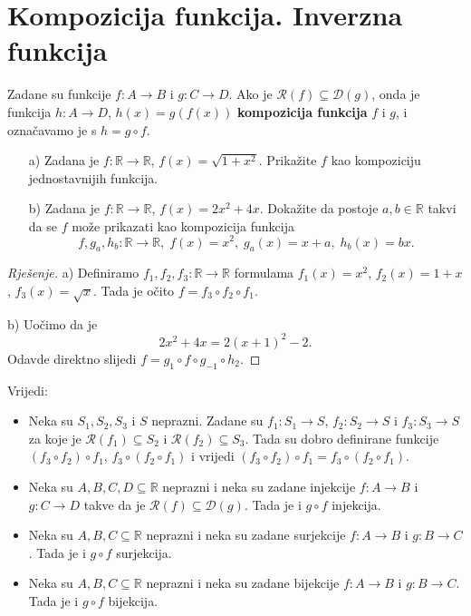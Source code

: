 \section{Kompozicija funkcija. Inverzna funkcija}
\begin{definition}
Zadane su funkcije $f : A\to B$ i $g : C\to D$. Ako je $\mathcal{R}(f)\subseteq \mathcal{D}(g)$, onda je funkcija $h : A\to D$, $h(x)=g(f(x))$ \textbf{kompozicija funkcija} $f$ i $g$, i označavamo je s $h=g\circ f$.
\end{definition}
\begin{exercise} \textbf{}
\begin{itemize}
\item[a)] Zadana je $f : \mathbb{R}\to \mathbb{R}$, $f(x)=\sqrt{1+x^2}$. Prikažite $f$ kao kompoziciju jednostavnijih funkcija.
\item[b)] Zadana je $f : \mathbb{R}\to \mathbb{R}$, $f(x)=2x^2+4x$. Dokažite da postoje $a, b\in \mathbb{R}$ takvi da se $f$ može prikazati kao kompozicija funkcija $$f,g_a,h_b : \mathbb{R}\to \mathbb{R},\;f(x)=x^2,\; g_a(x)=x+a,\; h_b(x)=bx.$$
\end{itemize}
\end{exercise}
\begin{proof}[Rješenje]
a) Definiramo $f_1, f_2, f_3 : \mathbb{R}\to \mathbb{R}$ formulama $f_1(x)=x^2$, $f_2(x)=1+x$, $f_3(x)=\sqrt{x}$. Tada je očito $f=f_3\circ f_2\circ f_1$.

b) Uočimo da je
$$2x^2+4x=2(x+1)^2-2.$$
Odavde direktno slijedi $f=g_1\circ f\circ g_{-1}\circ h_2.$
\end{proof}
\begin{remark} Vrijedi:
\begin{itemize}
\item Neka su $S_1, S_2, S_3$ i $S$ neprazni. Zadane su $f_1 : S_1 \to S$, $f_2 : S_2\to S$ i $f_3 : S_3\to S$ za koje je $\mathcal{R}(f_1)\subseteq S_2$ i $\mathcal{R}(f_2)\subseteq S_3$. Tada su dobro definirane funkcije $(f_3\circ f_2)\circ f_1$, $f_3\circ (f_2\circ f_1)$ i vrijedi $(f_3\circ f_2)\circ f_1=f_3\circ (f_2\circ f_1).$
\item Neka su $A, B, C, D\subseteq \mathbb{R}$ neprazni i neka su zadane injekcije $f : A\to B$ i $g : C\to D$ takve da je $\mathcal{R}(f)\subseteq \mathcal{D}(g)$. Tada je i $g\circ f$ injekcija.
\item Neka su $A, B, C\subseteq \mathbb{R}$ neprazni i neka su zadane surjekcije $f : A\to B$ i $g : B\to C$. Tada je i $g\circ f$ surjekcija.
\item Neka su $A, B, C\subseteq \mathbb{R}$ neprazni i neka su zadane bijekcije $f : A\to B$ i $g : B\to C$. Tada je i $g\circ f$ bijekcija.
\end{itemize}
\end{remark}

